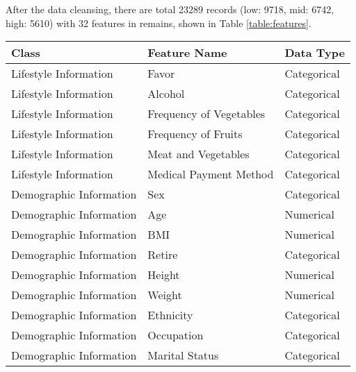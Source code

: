 \documentclass{article}
\begin{document}
 After the data cleansing, there are total 23289 records (low: 9718, mid: 6742, high: 5610) with 32 features in remains, shown in Table \ref{table:features}.  %
\begin{table}[H]
\small
\centering
\begin{tabular}{lll}
\hline
\textbf{Class}                          & \textbf{Feature Name}    & \textbf{Data Type} \\ \hline
Lifestyle Information                   & Favor                    & Categorical        \\
Lifestyle Information                   & Alcohol                  & Categorical        \\
Lifestyle Information                   & Frequency of Vegetables  & Categorical       \\
Lifestyle Information                   & Frequency of Fruits      & Categorical       \\
Lifestyle Information                   & Meat and Vegetables      & Categorical       \\
Lifestyle Information                   & Medical Payment Method   & Categorical       \\
Demographic Information                 & Sex                      & Categorical        \\
Demographic Information                 & Age                      & Numerical          \\
Demographic Information                 & BMI                      & Numerical          \\
Demographic Information                 & Retire                   & Categorical        \\
Demographic Information                 & Height                   & Numerical          \\
Demographic Information                 & Weight                   & Numerical          \\
Demographic Information                 & Ethnicity                & Categorical        \\
Demographic Information                 & Occupation               & Categorical        \\
Demographic Information                 & Marital Status           & Categorical        \\

\end{tabular}
\end{table}
\end{document}
